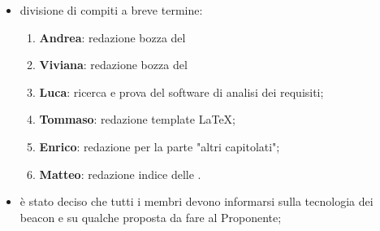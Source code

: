 \documentclass[a4paper,titlepage]{article}
\begin{document}
\begin{itemize}
  \item divisione di compiti a breve termine:
  \begin{enumerate}  %
  	\item \textbf{Andrea}: redazione bozza del 
  	\item \textbf{Viviana}: redazione bozza del 
  	\item \textbf{Luca}: ricerca e prova del software di analisi dei requisiti;
  	\item \textbf{Tommaso}: redazione template \LaTeX;
  	\item \textbf{Enrico}: redazione  per la parte "altri capitolati";
  	\item \textbf{Matteo}: redazione indice delle .
  \end{enumerate}
  \item è stato deciso che tutti i membri devono informarsi sulla tecnologia dei beacon e su qualche proposta da fare al Proponente; %
\end{itemize}
\end{document}
